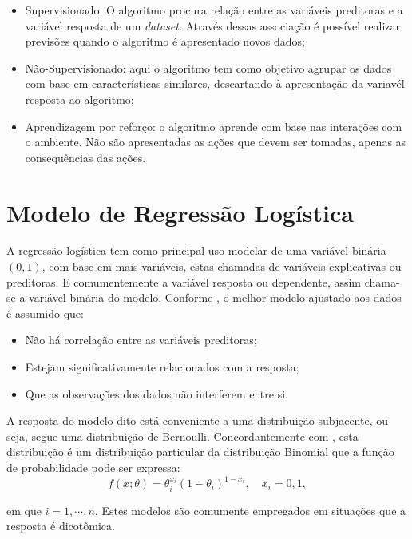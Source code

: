 \documentclass[
	12pt,				%
	openright,			%
	oneside,      %
	a4paper,			%
	english,			%
	french,				%
	spanish,			%
	brazil,				%
	]{abntex2}\usepackage[]{graphicx}\usepackage[]{xcolor}
\begin{document}
\begin{itemize}
  \item Supervisionado: O algoritmo procura relação entre as variáveis preditoras e 
  a variável resposta de um \textit{dataset}. Através dessas associação é possível 
  realizar previsões quando o algoritmo é apresentado novos dados;
  \item Não-Supervisionado: aqui o algoritmo tem como objetivo agrupar os dados com 
  base em características similares, descartando à apresentação da variavél resposta ao 
  algoritmo;
  \item Aprendizagem por reforço: o algoritmo aprende com base nas interações com o 
  ambiente. Não são apresentadas as ações que devem ser tomadas, apenas as consequências das ações.
\end{itemize}


  \section{Modelo de Regressão Logística}

  
A regressão logística tem como principal uso modelar de uma variável binária $(0,1)$,
com base em mais variáveis, estas chamadas de variáveis explicativas ou preditoras.
E comumentemente a variável resposta ou dependente, assim chama-se a variável
binária do modelo. Conforme \cite{hilbe2016practical}, o melhor modelo ajustado 
aos dados é assumido que:
\begin{itemize}
  \item Não há correlação entre as variáveis preditoras;
  \item Estejam significativamente relacionados com a resposta;
  \item Que as observações dos dados não interferem entre si.
\end{itemize}
  
A resposta do modelo dito está conveniente a uma distribuição subjacente, ou seja,
segue uma distribuição de Bernoulli. Concordantemente com \cite{bolfarine2001introduccao}, 
esta distribuição é um distribuição particular da distribuição Binomial que 
a função de probabilidade pode ser expressa:
\begin{equation}\label{bernoulli}
  f(x;\theta) = \theta_{i}^{x_i}(1 - \theta_{i})^{1 - x_i}, \quad x_i = 0,1,
\end{equation}

\noindent em que $i = 1,\cdots,n$. Estes modelos são comumente empregados em situações
que a resposta é dicotômica.
\end{document}
